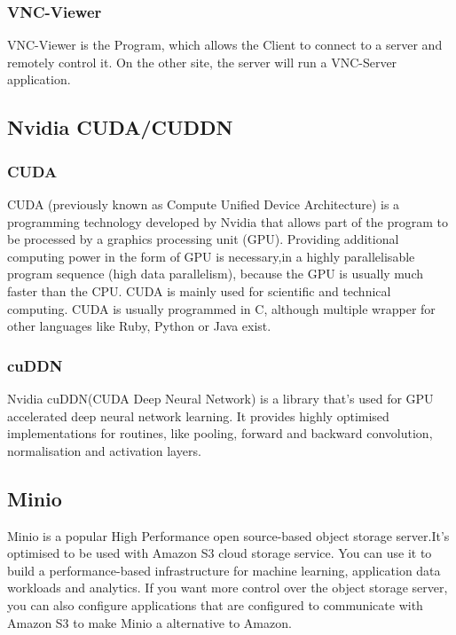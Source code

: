 \subsubsection{VNC-Viewer}
VNC-Viewer is the Program, which allows the Client to connect to a server and remotely control it. On the other site, the server will run a VNC-Server application.


\subsection{Nvidia CUDA/CUDDN}

\subsubsection{CUDA}
CUDA (previously known as Compute Unified Device Architecture) is a programming technology developed by Nvidia that allows part of the program to be processed by a graphics processing unit (GPU). Providing additional computing power in the form of GPU is necessary,in a highly parallelisable program sequence (high data parallelism), because the GPU is usually much faster than the CPU. CUDA is mainly used for scientific and technical computing. CUDA is usually programmed in C, although multiple wrapper for other languages like Ruby, Python or Java exist.

\subsubsection{cuDDN}
Nvidia cuDDN(CUDA Deep Neural Network) is a library that's used for GPU accelerated deep neural network learning. It provides highly optimised implementations for routines, like pooling, forward and backward convolution, normalisation and activation layers.

\subsection{Minio}
Minio is a popular High Performance open source-based object storage server.It's optimised to be used with Amazon S3 cloud storage service. You can use it to build a performance-based infrastructure for machine learning, application data workloads and analytics. If you want more control over the object storage server, you can also configure applications that are configured to communicate with Amazon S3 to make Minio a alternative to Amazon.


